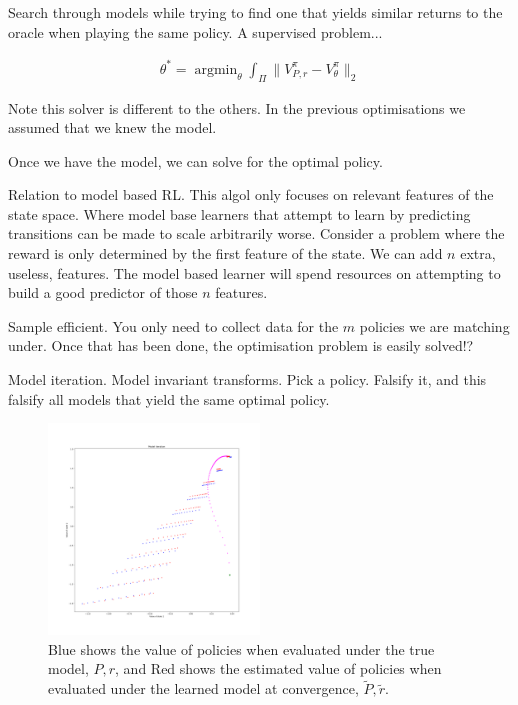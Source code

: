 Search through models while trying to find one that yields similar returns to the oracle when playing the same policy.
A supervised problem...

\begin{align}
\theta^{* } = \mathop{\text{argmin}}_{\theta} \int_{\Pi} \parallel V^{\pi}_{P, r} -V^{\pi}_{\theta} \parallel_2
\end{align}

Note this solver is different to the others. In the previous optimisations we assumed that we knew the model.


Once we have the model, we can solve for the optimal policy.

Relation to model based RL. This algol only focuses on relevant features of the state space.
Where model base learners that attempt to learn by predicting transitions can be made to scale arbitrarily worse.
Consider a problem where the reward is only determined by the first feature of the state. We can add $n$ extra, useless, features.
The model based learner will spend resources on attempting to build a good predictor of those $n$ features.

Sample efficient. You only need to collect data for the $m$ policies we are matching under.
Once that has been done, the optimisation problem is easily solved!?

Model iteration. Model invariant transforms. Pick a policy. Falsify it,
and this falsify all models that yield the same optimal policy.

\begin{figure}
\centering
\includegraphics[width=0.5\textwidth,height=0.5\textheight]{../../pictures/figures/model_iteration.png}
\caption{Blue shows the value of policies when evaluated under the true model, $P, r$,
and Red shows the estimated value of policies when evaluated under the learned model at convergence, $\tilde P, \tilde r$.}
\end{figure}



